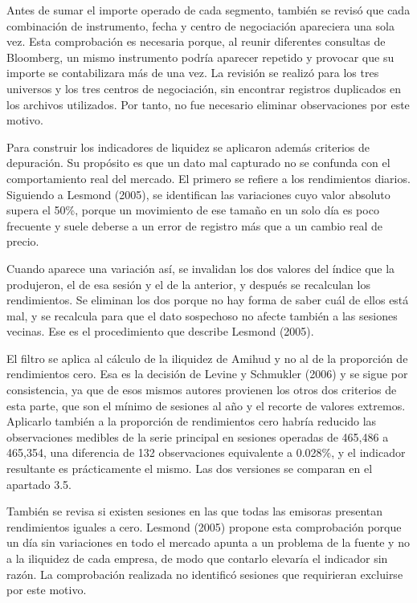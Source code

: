 Antes de sumar el importe operado de cada segmento, también se revisó que cada combinación de instrumento, fecha y centro de negociación apareciera una sola vez. Esta comprobación es necesaria porque, al reunir diferentes consultas de Bloomberg, un mismo instrumento podría aparecer repetido y provocar que su importe se contabilizara más de una vez. La revisión se realizó para los tres universos y los tres centros de negociación, sin encontrar registros duplicados en los archivos utilizados. Por tanto, no fue necesario eliminar observaciones por este motivo.

Para construir los indicadores de liquidez se aplicaron además criterios de depuración. Su propósito es que un dato mal capturado no se confunda con el comportamiento real del mercado. El primero se refiere a los rendimientos diarios. Siguiendo a Lesmond (2005), se identifican las variaciones cuyo valor absoluto supera el 50\%, porque un movimiento de ese tamaño en un solo día es poco frecuente y suele deberse a un error de registro más que a un cambio real de precio.

Cuando aparece una variación así, se invalidan los dos valores del índice que la produjeron, el de esa sesión y el de la anterior, y después se recalculan los rendimientos. Se eliminan los dos porque no hay forma de saber cuál de ellos está mal, y se recalcula para que el dato sospechoso no afecte también a las sesiones vecinas. Ese es el procedimiento que describe Lesmond (2005).

El filtro se aplica al cálculo de la iliquidez de Amihud y no al de la proporción de rendimientos cero. Esa es la decisión de Levine y Schmukler (2006) y se sigue por consistencia, ya que de esos mismos autores provienen los otros dos criterios de esta parte, que son el mínimo de sesiones al año y el recorte de valores extremos. Aplicarlo también a la proporción de rendimientos cero habría reducido las observaciones medibles de la serie principal en sesiones operadas de 465,486 a 465,354, una diferencia de 132 observaciones equivalente a 0.028\%, y el indicador resultante es prácticamente el mismo. Las dos versiones se comparan en el apartado 3.5.

También se revisa si existen sesiones en las que todas las emisoras presentan rendimientos iguales a cero. Lesmond (2005) propone esta comprobación porque un día sin variaciones en todo el mercado apunta a un problema de la fuente y no a la iliquidez de cada empresa, de modo que contarlo elevaría el indicador sin razón. La comprobación realizada no identificó sesiones que requirieran excluirse por este motivo.

